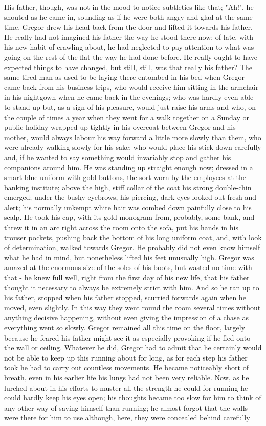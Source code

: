 His father, though, was not in the mood to notice subtleties like that; "Ah!", he shouted as he came in, sounding as if he were both angry and glad at the same time. Gregor drew his head back from the door and lifted it towards his father. He really had not imagined his father the way he stood there now; of late, with his new habit of crawling about, he had neglected to pay attention to what was going on the rest of the flat the way he had done before. He really ought to have expected things to have changed, but still, still, was that really his father? The same tired man as used to be laying there entombed in his bed when Gregor came back from his business trips, who would receive him sitting in the armchair in his nightgown when he came back in the evenings; who was hardly even able to stand up but, as a sign of his pleasure, would just raise his arms and who, on the couple of times a year when they went for a walk together on a Sunday or public holiday wrapped up tightly in his overcoat between Gregor and his mother, would always labour his way forward a little more slowly than them, who were already walking slowly for his sake; who would place his stick down carefully and, if he wanted to say something would invariably stop and gather his companions around him. He was standing up straight enough now; dressed in a smart blue uniform with gold buttons, the sort worn by the employees at the banking institute; above the high, stiff collar of the coat his strong double-chin emerged; under the bushy eyebrows, his piercing, dark eyes looked out fresh and alert; his normally unkempt white hair was combed down painfully close to his scalp. He took his cap, with its gold monogram from, probably, some bank, and threw it in an arc right across the room onto the sofa, put his hands in his trouser pockets, pushing back the bottom of his long uniform coat, and, with look of determination, walked towards Gregor. He probably did not even know himself what he had in mind, but nonetheless lifted his feet unusually high. Gregor was amazed at the enormous size of the soles of his boots, but wasted no time with that - he knew full well, right from the first day of his new life, that his father thought it necessary to always be extremely strict with him. And so he ran up to his father, stopped when his father stopped, scurried forwards again when he moved, even slightly. In this way they went round the room several times without anything decisive happening, without even giving the impression of a chase as everything went so slowly. Gregor remained all this time on the floor, largely because he feared his father might see it as especially provoking if he fled onto the wall or ceiling. Whatever he did, Gregor had to admit that he certainly would not be able to keep up this running about for long, as for each step his father took he had to carry out countless movements. He became noticeably short of breath, even in his earlier life his lungs had not been very reliable. Now, as he lurched about in his efforts to muster all the strength he could for running he could hardly keep his eyes open; his thoughts became too slow for him to think of any other way of saving himself than running; he almost forgot that the walls were there for him to use although, here, they were concealed behind carefully 